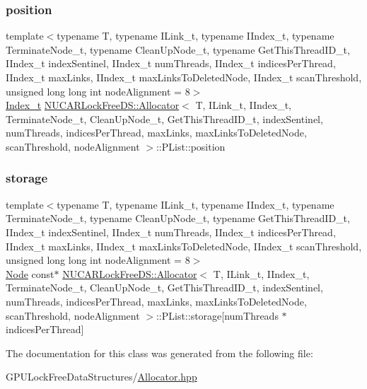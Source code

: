 \subsubsection{\texorpdfstring{position}{position}}
{\footnotesize\ttfamily template$<$typename T, typename I\+Link\+\_\+t, typename I\+Index\+\_\+t, typename Terminate\+Node\+\_\+t, typename Clean\+Up\+Node\+\_\+t, typename Get\+This\+Thread\+I\+D\+\_\+t, I\+Index\+\_\+t index\+Sentinel, I\+Index\+\_\+t num\+Threads, I\+Index\+\_\+t indices\+Per\+Thread, I\+Index\+\_\+t max\+Links, I\+Index\+\_\+t max\+Links\+To\+Deleted\+Node, I\+Index\+\_\+t scan\+Threshold, unsigned long long int node\+Alignment = 8$>$ \\
\mbox{\hyperlink{class_n_u_c_a_r_lock_free_d_s_1_1_allocator_a2776cca35e8343bf5007bd8b6f3a3f8f}{Index\+\_\+t}} \mbox{\hyperlink{class_n_u_c_a_r_lock_free_d_s_1_1_allocator}{N\+U\+C\+A\+R\+Lock\+Free\+D\+S\+::\+Allocator}}$<$ T, I\+Link\+\_\+t, I\+Index\+\_\+t, Terminate\+Node\+\_\+t, Clean\+Up\+Node\+\_\+t, Get\+This\+Thread\+I\+D\+\_\+t, index\+Sentinel, num\+Threads, indices\+Per\+Thread, max\+Links, max\+Links\+To\+Deleted\+Node, scan\+Threshold, node\+Alignment $>$\+::P\+List\+::position\hspace{0.3cm}{\ttfamily [private]}}

\mbox{\label{class_n_u_c_a_r_lock_free_d_s_1_1_allocator_1_1_p_list_ac90fa5d4c7048415d16c8b46e5b3290a}} 
\subsubsection{\texorpdfstring{storage}{storage}}
{\footnotesize\ttfamily template$<$typename T, typename I\+Link\+\_\+t, typename I\+Index\+\_\+t, typename Terminate\+Node\+\_\+t, typename Clean\+Up\+Node\+\_\+t, typename Get\+This\+Thread\+I\+D\+\_\+t, I\+Index\+\_\+t index\+Sentinel, I\+Index\+\_\+t num\+Threads, I\+Index\+\_\+t indices\+Per\+Thread, I\+Index\+\_\+t max\+Links, I\+Index\+\_\+t max\+Links\+To\+Deleted\+Node, I\+Index\+\_\+t scan\+Threshold, unsigned long long int node\+Alignment = 8$>$ \\
\mbox{\hyperlink{class_n_u_c_a_r_lock_free_d_s_1_1_allocator_1_1_node}{Node}} const$\ast$ \mbox{\hyperlink{class_n_u_c_a_r_lock_free_d_s_1_1_allocator}{N\+U\+C\+A\+R\+Lock\+Free\+D\+S\+::\+Allocator}}$<$ T, I\+Link\+\_\+t, I\+Index\+\_\+t, Terminate\+Node\+\_\+t, Clean\+Up\+Node\+\_\+t, Get\+This\+Thread\+I\+D\+\_\+t, index\+Sentinel, num\+Threads, indices\+Per\+Thread, max\+Links, max\+Links\+To\+Deleted\+Node, scan\+Threshold, node\+Alignment $>$\+::P\+List\+::storage\mbox{[}num\+Threads $\ast$indices\+Per\+Thread\mbox{]}\hspace{0.3cm}{\ttfamily [private]}}



The documentation for this class was generated from the following file\+:\begin{DoxyCompactItemize}
\item 
G\+P\+U\+Lock\+Free\+Data\+Structures/\mbox{\hyperlink{_allocator_8hpp}{Allocator.\+hpp}}\end{DoxyCompactItemize}
